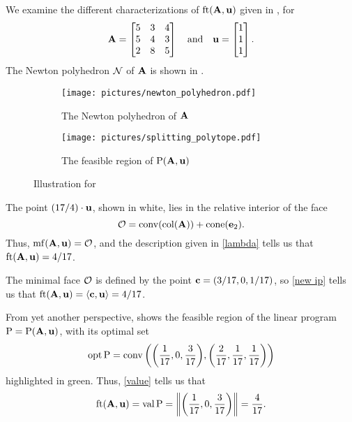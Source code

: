 \documentclass{amsart}
\begin{document}
\begin{example}
   \label{ex: ft}
   We examine the different characterizations of $\operatorname{ft}(\mathbf{A}, \mathbf{u})$ given in , for
   \[\mathbf{A}=\begin{bmatrix}5&3&4\\ 5&4&3\\ 2&8&5\end{bmatrix} \quad \text{and} \quad \mathbf{u} =
      \begin{bmatrix} 1 \\ 1\\ 1 \end{bmatrix}.\]
   The Newton polyhedron $\mathcal{N}$ of $\mathbf{A}$ is shown in .
   \begin{figure}
   \centering
   \begin{subfigure}{.48\textwidth}
      \centering
      \texttt{[image: pictures/newton\_polyhedron.pdf]}\\[1.4mm]
      \caption{The Newton polyhedron of $\mathbf{A}$}
      \label{fig: newton polyhedron}
   \end{subfigure}
   \begin{subfigure}{.48\textwidth}
      \centering
      \texttt{[image: pictures/splitting\_polytope.pdf]}
      \caption{The feasible region of $\mathrm{P}(\mathbf{A},\mathbf{u})$}
      \label{fig: splitting polytope}
   \end{subfigure}
      \caption{Illustration for }
   \label{fig: newton polyhedron and splitting polytope}
   \end{figure}
   The point $(17/4)\cdot \mathbf{u}$, shown in white, lies in the relative interior of the face
   \[\mathcal{O} = \operatorname{conv}(\operatorname{col}(\mathbf{A})) + \operatorname{cone}(\mathbf{e}_2).\]
   Thus, $\operatorname{mf}(\mathbf{A},\mathbf{u}) = \mathcal{O}$, and the description given in \ref{lambda} tells us that $\operatorname{ft}(\mathbf{A}, \mathbf{u}) = 4/17$.

   The minimal face $\mathcal{O}$ is defined by the point $\mathbf{c} = (3/17, 0, 1/17)$, so \ref{new ip} tells us that
   $\operatorname{ft}(\mathbf{A}, \mathbf{u}) = \langle \mathbf{c}, \mathbf{u} \rangle = 4/17$.

   From yet another perspective,  shows the feasible region of the linear program $\mathrm{P} = \mathrm{P}(\mathbf{A},\mathbf{u})$, with its optimal set
   \[\operatorname{opt} \mathrm{P} = \operatorname{conv}\bigg(\bigg(\frac1{17}, 0, \frac3{17}\bigg),\bigg(\frac2{17}, \frac1{17}, \frac1{17}\bigg)\bigg)\]
   highlighted in green.
   Thus, \ref{value} tells us that
   \[\operatorname{ft}(\mathbf{A}, \mathbf{u}) = \operatorname{val} \mathrm{P} = \bigg\|\bigg(\frac1{17}, 0, \frac3{17}\bigg)\bigg\| = \frac4{17}.\]
\end{example}
\end{document}

